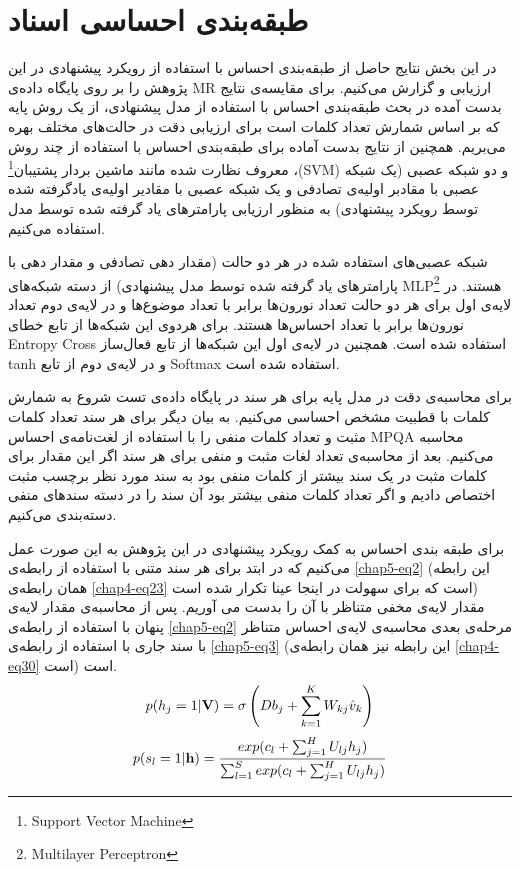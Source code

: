 \section{طبقه‌بندی احساسی اسناد}
\label{chap5sec9}
در این بخش نتایج حاصل از طبقه‌بندی احساس با استفاده از رویکرد پیشنهادی در این پژوهش را بر روی پایگاه داده‌ی
MR
ارزیابی و گزارش می‌‌کنیم. برای مقایسه‌ی نتایج بدست آمده در بحث طبقه‌بندی احساس با استفاده از مدل پیشنهادی، از یک روش پایه که بر اساس شمارش تعداد کلمات است برای ارزیابی دقت در حالت‌های مختلف بهره می‌‌بریم. همچنین از نتایج بدست آماده برای طبقه‌بندی احساس با استفاده از چند روش معروف نظارت شده مانند ماشین بردار پشتیبان\footnote{Support Vector Machine}
،(SVM)
و دو شبکه عصبی (یک شبکه‌ عصبی با مقادبر اولیه‌ی تصادفی و یک شبکه‌ عصبی با مقادیر اولیه‌ی یادگرفته شده توسط رویکرد پیشنهادی) به منظور ارزیابی پارامترهای یاد گرفته شده توسط مدل استفاده می‌کنیم.

شبکه عصبی‌های استفاده شده در هر دو حالت (مقدار دهی تصادفی و مقدار دهی با پارامترهای یاد گرفته شده توسط مدل پیشنهادی) از دسته شبکه‌های 
MLP\footnote{Multilayer Perceptron}
هستند. در لایه‌ی اول برای هر دو حالت تعداد نورون‌ها برابر با تعداد موضوع‌ها و در لایه‌ی دوم تعداد نورون‌ها برابر با تعداد احساس‌ها هستند. برای هردوی این شبکه‌ها از تابع خطای
Entropy Cross 
استفاده شده است. همچنین در لایه‌ی اول این شبکه‌ها از تابع فعال‌ساز 
tanh
و در لایه‌ی دوم از تابع
Softmax
استفاده شده است.
%

برای محاسبه‌ی دقت در مدل پایه برای هر سند در پایگاه داده‌ی تست شروع به شمارش کلمات با قطبیت مشخص احساسی‌ می‌‌کنیم. به بیان دیگر برای هر سند تعداد کلمات مثبت و تعداد کلمات منفی را با استفاده از لغت‌نامه‌ی احساس
MPQA
محاسبه می‌کنیم. بعد از محاسبه‌ی تعداد لغات مثبت و منفی‌ برای هر سند اگر این مقدار برای کلمات مثبت در یک سند بیشتر از کلمات منفی‌ بود به سند مورد نظر برچسب مثبت اختصاص دادیم و اگر تعداد کلمات منفی‌ بیشتر بود آن سند را در دسته سندهای منفی‌ دسته‌بندی می‌کنیم.

برای طبقه بندی احساس به کمک رویکرد پیشنهادی در این پژوهش به این صورت عمل می‌کنیم که در ابتد برای هر سند متنی با استفاده از رابطه‌ی
\ref{chap5-eq2}
(این رابطه‌ همان رابطه‌ی \ref{chap4-eq23} است که برای سهولت در اینجا عینا تکرار شده است) مقدار لایه‌ی مخفی متناظر با آن را بدست می آوریم. پس از محاسبه‌ی مقدار لایه‌ی پنهان با استفاده از رابطه‌ی
\ref{chap5-eq2}
مرحله‌ی بعدی محاسبه‌ی لایه‌ی احساس متناظر با سند جاری با استفاده از رابطه‌ی
\ref{chap5-eq3}
(این رابطه‌ نیز همان رابطه‌‌ی \ref{chap4-eq30} است)
است. 
\begin{align}
	\centering
	\label{chap5-eq2}
	p(h_{j}=1|\textbf{V})=\sigma \left( Db_j + \sum_{k=1}^{K}W_{kj}\hat{v}_k \right)
\end{align}
\begin{align}
	\centering
	\label{chap5-eq3}
	p(s_{l}=1|\textbf{h})=\dfrac{exp(c_{l}+\sum_{j=1}^{H}U_{lj}h_j)}{\sum_{l=1}^{S}exp(c_{l}+\sum_{j=1}^{H}U_{lj}h_j)}
\end{align}

